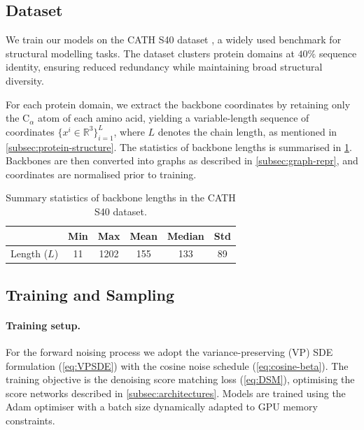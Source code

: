 \documentclass[a4paper,12pt]{article}
\begin{document}
\subsection{Dataset}\label{subsec:dataset}
We train our models on the CATH S40 dataset \citep{orengo1997CATHHierarchicClassification,waman2024CATH2024CATHAlphaFlow,sillitoe2021CATHIncreasedStructural,lewis2018Gene3DExtensivePrediction}, a widely used benchmark for structural modelling tasks. The dataset clusters protein domains at \(40\%\) sequence identity, ensuring reduced redundancy while maintaining broad structural diversity. 

For each protein domain, we extract the backbone coordinates by retaining only the C\(_\alpha\) atom of each amino acid, yielding a variable-length sequence of coordinates \(\{x^i \in \mathbb{R}^3\}_{i=1}^L\), where \(L\) denotes the chain length, as mentioned in \cref{subsec:protein-structure}. The statistics of backbone lengths is summarised in \cref{tab:cath-stats}. Backbones are then converted into graphs as described in \cref{subsec:graph-repr}, and coordinates are normalised prior to training.

\begin{table}[htbp]
    \centering
    \caption{Summary statistics of backbone lengths in the CATH S40 dataset.}
    \label{tab:cath-stats}
    \begin{tabular}{lccccc}
        \toprule
        & Min & Max & Mean & Median & Std \\
        \midrule
        Length (\(L\)) & 11 & 1202 & 155 & 133 & 89 \\
        \bottomrule
    \end{tabular}
\end{table}

\subsection{Training and Sampling}
\paragraph{Training setup.}
For the forward noising process we adopt the variance-preserving (VP) SDE formulation (\cref{eq:VPSDE}) with the cosine noise schedule (\cref{eq:cosine-beta}). The training objective is the denoising score matching loss (\cref{eq:DSM}), optimising the score networks described in \cref{subsec:architectures}. Models are trained using the Adam optimiser \citep{kingma2017AdamMethodStochastic} with a batch size dynamically adapted to GPU memory constraints.
\end{document}
